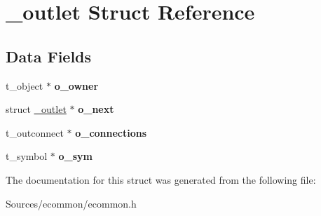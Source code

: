 \hypertarget{struct__outlet}{\section{\-\_\-outlet Struct Reference}
\label{struct__outlet}
}
\subsection*{Data Fields}
\begin{DoxyCompactItemize}
\item 
\hypertarget{struct__outlet_a7bdd65bdf46102a176835f19b3a2305b}{t\-\_\-object $\ast$ {\bfseries o\-\_\-owner}}\label{struct__outlet_a7bdd65bdf46102a176835f19b3a2305b}

\item 
\hypertarget{struct__outlet_ae26edec286a8bef11baa15ac0b9480e8}{struct \hyperlink{struct__outlet}{\-\_\-outlet} $\ast$ {\bfseries o\-\_\-next}}\label{struct__outlet_ae26edec286a8bef11baa15ac0b9480e8}

\item 
\hypertarget{struct__outlet_a18a291d6dfc4d4f5c380381138774af4}{t\-\_\-outconnect $\ast$ {\bfseries o\-\_\-connections}}\label{struct__outlet_a18a291d6dfc4d4f5c380381138774af4}

\item 
\hypertarget{struct__outlet_a305d36ab508da845dc8909a4b8570f9a}{t\-\_\-symbol $\ast$ {\bfseries o\-\_\-sym}}\label{struct__outlet_a305d36ab508da845dc8909a4b8570f9a}

\end{DoxyCompactItemize}


The documentation for this struct was generated from the following file\-:\begin{DoxyCompactItemize}
\item 
Sources/ecommon/ecommon.\-h\end{DoxyCompactItemize}
